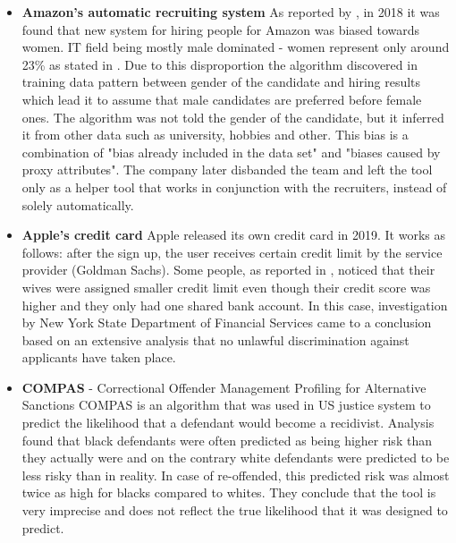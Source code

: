 \begin{itemize}
    \item \textbf{Amazon's automatic recruiting system}\newline
    As reported by \cite{amazon-unfair-hiring-2018}, in 2018 it was found that new system for hiring people for Amazon was biased towards women. IT field being mostly male dominated - women represent only around 23\% as stated in \cite{women-in-tech-2021}. Due to this disproportion the algorithm discovered in training data pattern between gender of the candidate and hiring results which lead it to assume that male candidates are preferred before female ones. The algorithm was not told the gender of the candidate, but it inferred it from other data such as university, hobbies and other. This bias is a combination of "bias already included in the data set" and "biases caused by proxy attributes". The company later disbanded the team and left the tool only as a helper tool that works in conjunction with the recruiters, instead of solely automatically.
    
    \item \textbf{Apple's credit card}\newline
    Apple released its own credit card in 2019. It works as follows: after the sign up, the user receives certain credit limit by the service provider (Goldman Sachs). Some people, as reported in \cite{apple-card-washingtonpost-2019}, noticed that their wives were assigned smaller credit limit even though their credit score was higher and they only had one shared bank account.
    In this case, investigation by New York State Department of Financial Services came to a conclusion based on an extensive analysis that no unlawful discrimination against applicants have taken place.%
    
    \item \textbf{COMPAS} - Correctional Offender Management Profiling for Alternative Sanctions\newline
    COMPAS is an algorithm that was used in US justice system to predict the likelihood that a defendant would become a recidivist. Analysis \cite{compas-analysis-2020} found that black defendants were often predicted as being higher risk than they actually were and on the contrary white defendants were predicted to be less risky than in reality. In case of re-offended, this predicted risk was almost twice as high for blacks compared to whites. They conclude that the tool is very imprecise and does not reflect the true likelihood that it was designed to predict.
\end{itemize}

